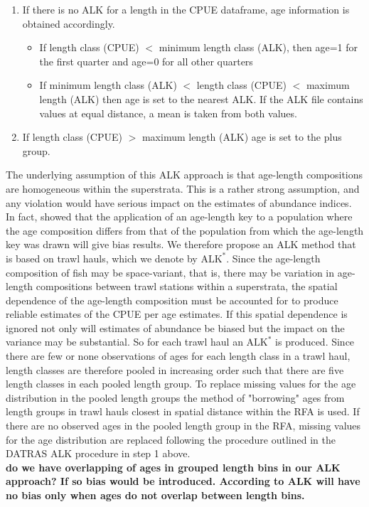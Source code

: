 \documentclass[a4paper 12pt]{article}
\numberwithin{equation}{section}
\begin{document}
\begin{enumerate}
\item If there is no ALK for a length in the CPUE dataframe, age information is obtained accordingly.
\begin{itemize}
\item If length class (CPUE) $<$ minimum length class (ALK), then age=1 for the first quarter and age=0 for all other quarters
\item  If minimum length class (ALK) $<$ length class (CPUE) $<$ maximum length (ALK) then age is set to the nearest ALK. If the ALK file contains values at equal distance, a mean is taken from both values. 
\end{itemize}

\item If length class (CPUE) $>$ maximum length (ALK) age is set to the plus group.
\end{enumerate}
The underlying assumption of this ALK approach is that age-length compositions are homogeneous within the superstrata. This is a rather strong assumption, and any violation would have serious impact on the estimates of abundance indices. In fact, \citet{kimura1977statistical} showed that the application of an age-length key  to a population where the age composition differs from that of the population from which the age-length key was drawn will give bias results. We therefore propose an ALK method that is based on trawl hauls, which we denote by $\mathrm{ALK}^{*}$. Since the age-length composition of fish may be space-variant, that is, there may be variation in age-length compositions between trawl stations within a superstrata, the spatial dependence of the age-length composition must be accounted for to produce reliable estimates of the CPUE per age estimates. If this spatial dependence is ignored not only will estimates of abundance be biased but the impact on the variance may be substantial. So for each trawl haul an $\mathrm{ALK}^{*}$ is produced. Since there are few or none observations of ages for each length class in a trawl haul, length classes are therefore pooled in increasing order such that there are five length classes in each pooled length group. To replace missing values for the age distribution in the pooled length groups the method of "borrowing" ages from length groups in trawl hauls closest in spatial distance within the RFA is used. If there are no observed ages in the pooled length group in the RFA, missing values for the age distribution are replaced following the procedure outlined in the DATRAS ALK procedure in step 1 above.  \\
 {\bf do we have overlapping of ages in grouped length bins in our ALK approach? If so bias would be introduced. According to \citet{westrheim1978bias} ALK will have no bias only when ages do not overlap between length bins.}
 
\end{document}
